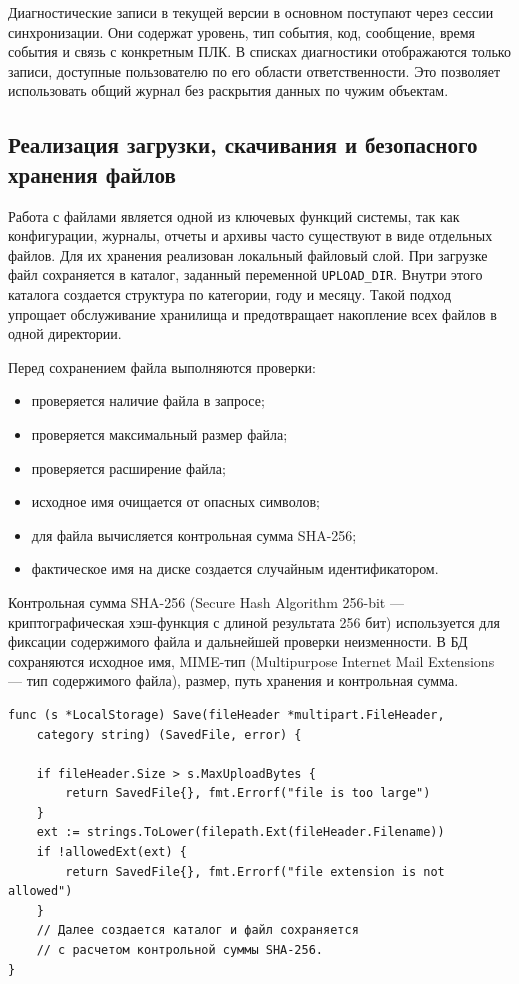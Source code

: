 Диагностические записи в текущей версии в основном поступают через сессии синхронизации. Они содержат уровень, тип события, код, сообщение, время события и связь с конкретным ПЛК. В списках диагностики отображаются только записи, доступные пользователю по его области ответственности. Это позволяет использовать общий журнал без раскрытия данных по чужим объектам.


\subsection{Реализация загрузки, скачивания и безопасного хранения файлов}

Работа с файлами является одной из ключевых функций системы, так как конфигурации, журналы, отчеты и архивы часто существуют в виде отдельных файлов. Для их хранения реализован локальный файловый слой. При загрузке файл сохраняется в каталог, заданный переменной \texttt{UPLOAD\_DIR}. Внутри этого каталога создается структура по категории, году и месяцу. Такой подход упрощает обслуживание хранилища и предотвращает накопление всех файлов в одной директории.

Перед сохранением файла выполняются проверки:
\begin{itemize}
    \item проверяется наличие файла в запросе;
    \item проверяется максимальный размер файла;
    \item проверяется расширение файла;
    \item исходное имя очищается от опасных символов;
    \item для файла вычисляется контрольная сумма SHA-256;
    \item фактическое имя на диске создается случайным идентификатором.
\end{itemize}

Контрольная сумма SHA-256 (Secure Hash Algorithm 256-bit --- криптографическая хэш-функция с длиной результата 256 бит) используется для фиксации содержимого файла и дальнейшей проверки неизменности. В БД сохраняются исходное имя, MIME-тип (Multipurpose Internet Mail Extensions --- тип содержимого файла), размер, путь хранения и контрольная сумма.

\begin{samepage}
\begin{lstlisting}[caption={Сохранение файла в управляемом каталоге}, label={lst:chapter3_storage_save}]
func (s *LocalStorage) Save(fileHeader *multipart.FileHeader,
    category string) (SavedFile, error) {

    if fileHeader.Size > s.MaxUploadBytes {
        return SavedFile{}, fmt.Errorf("file is too large")
    }
    ext := strings.ToLower(filepath.Ext(fileHeader.Filename))
    if !allowedExt(ext) {
        return SavedFile{}, fmt.Errorf("file extension is not allowed")
    }
    // Далее создается каталог и файл сохраняется
    // с расчетом контрольной суммы SHA-256.
}
\end{lstlisting}
\end{samepage}

